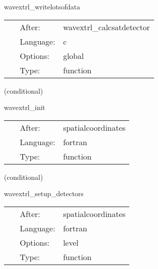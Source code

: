 \documentclass{article}
\begin{document}
\hspace{5mm} wavextrl\_writelotsofdata 

\hspace{5mm}{\it output one file per (l,m) mode, all detectors in one file } 


\hspace{5mm}

 \begin{tabular*}{160mm}{cll} 
~ & After:  & wavextrl\_calcsatdetector \\ 
~ & Language:  & c \\ 
~ & Options:  & global \\ 
~ & Type:  & function \\ 
\end{tabular*} 


\vspace{5mm}

   (conditional) 

\hspace{5mm} wavextrl\_init 

\hspace{5mm}{\it setup weights for integration } 


\hspace{5mm}

 \begin{tabular*}{160mm}{cll} 
~ & After:  & spatialcoordinates \\ 
~ & Language:  & fortran \\ 
~ & Type:  & function \\ 
\end{tabular*} 


\vspace{5mm}

   (conditional) 

\hspace{5mm} wavextrl\_setup\_detectors 

\hspace{5mm}{\it initial setup of all detectors } 


\hspace{5mm}

 \begin{tabular*}{160mm}{cll} 
~ & After:  & spatialcoordinates \\ 
~ & Language:  & fortran \\ 
~ & Options:  & level \\ 
~ & Type:  & function \\ 
\end{tabular*} 
\end{document}
